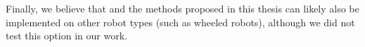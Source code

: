 Finally, we believe that \art and the methods proposed in this thesis can likely also be implemented on other robot types (such as wheeled robots), although we did not test this option in our work.








%
%
%
%
%
%
%
%
%
%
%
%
%
